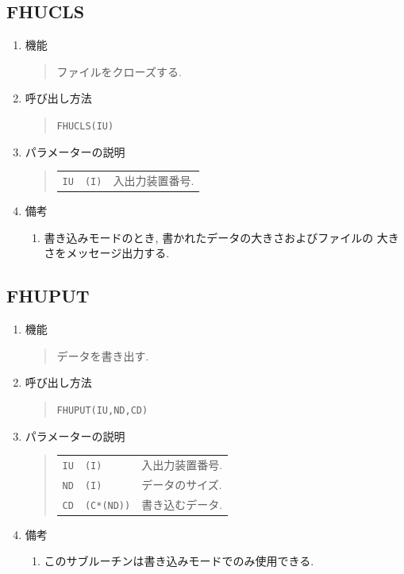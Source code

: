 \subsection{FHUCLS}
\begin{enumerate}
  \item 機能 
  \begin{quote}
    ファイルをクローズする. 
  \end{quote}
  \item 呼び出し方法 
  \begin{quote}
    {\tt FHUCLS(IU)}
  \end{quote}
  \item パラメーターの説明 
  \begin{quote}
    \begin{tabular}{llp{10cm}}
      {\tt IU}    & {\tt (I)} & 入出力装置番号. 
    \end{tabular}
  \end{quote}
  \item 備考 
  \begin{enumerate}
    \item 書き込みモードのとき, 書かれたデータの大きさおよびファイルの
          大きさをメッセージ出力する.
  \end{enumerate}
\end{enumerate}

\subsection{FHUPUT}
\begin{enumerate}
  \item 機能 
  \begin{quote}
   データを書き出す.
  \end{quote}
  \item 呼び出し方法 
  \begin{quote}
    {\tt FHUPUT(IU,ND,CD)}
  \end{quote}
  \item パラメーターの説明 
  \begin{quote}
    \begin{tabular}{llp{10cm}}
      {\tt IU}   & {\tt (I)} & 入出力装置番号. \\
      {\tt ND}   & {\tt (I)} & データのサイズ.\\
      {\tt CD}   & {\tt (C*(ND))} & 書き込むデータ.
    \end{tabular}
  \end{quote}
  \item 備考 
  \begin{enumerate}
    \item このサブルーチンは書き込みモードでのみ使用できる. 
  \end{enumerate}
\end{enumerate}

